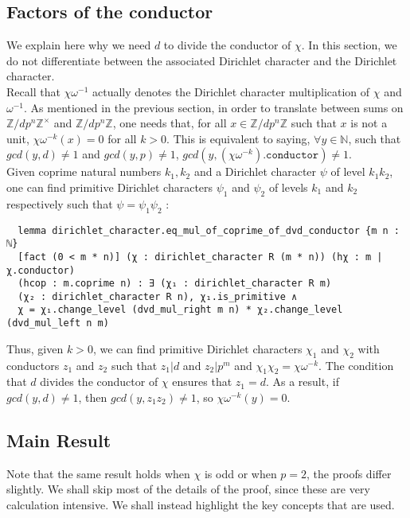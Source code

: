 \documentclass[a4paper,UKenglish,cleveref, autoref, thm-restate]{lipics-v2021}
\begin{document}
\subsection{Factors of the conductor}
We explain here why we need $d$ to divide the conductor of $\chi$. In this section, we do not differentiate between the associated Dirichlet 
character and the Dirichlet character. \\

Recall that $\chi \omega^{-1}$ actually denotes the Dirichlet 
character multiplication of $\chi$ and $\omega^{-1}$. As mentioned in the previous section, in order to translate between sums on 
$\mathbb{Z}/ d p^n \mathbb{Z} ^{\times}$ and $\mathbb{Z}/ d p^n \mathbb{Z}$, one needs that, for all $x \in \mathbb{Z}/ d p^n \mathbb{Z}$ 
such that $x$ is not a unit, $\chi \omega^{-k} (x) = 0$ for all $k > 0$. This is equivalent to saying, $\forall y \in \mathbb{N}$, such that 
$gcd (y, d) \ne 1$ and $gcd (y, p) \ne 1$, $gcd (y, (\chi \omega^{-k})\texttt{.conductor}) \ne 1$. \\

Given coprime natural numbers $k_1, k_2$ and a Dirichlet character $\psi$ of level $k_1 k_2$, one can find primitive Dirichlet characters 
$\psi_1$ and $\psi_2$ of levels $k_1$ and $k_2$ respectively such that $\psi = \psi_1 \psi_2$ : 
\begin{lstlisting}
  lemma dirichlet_character.eq_mul_of_coprime_of_dvd_conductor {m n : ℕ} 
  [fact (0 < m * n)] (χ : dirichlet_character R (m * n)) (hχ : m | χ.conductor) 
  (hcop : m.coprime n) : ∃ (χ₁ : dirichlet_character R m) 
  (χ₂ : dirichlet_character R n), χ₁.is_primitive ∧ 
  χ = χ₁.change_level (dvd_mul_right m n) * χ₂.change_level (dvd_mul_left n m) 
\end{lstlisting}

Thus, given $k > 0$, we can find primitive Dirichlet characters $\chi_1$ and $\chi_2$ with conductors $z_1$ and $z_2$ such that 
$z_1 | d$ and $z_2 | p^m$ and $\chi_1 \chi_2 = \chi \omega^{-k}$. The condition that $d$ divides the conductor of $\chi$ ensures 
that $z_1 = d$. As a result, if $gcd (y, d) \ne 1$, then $gcd (y, z_1 z_2) \ne 1$, so $\chi \omega^{-k} (y) = 0$.

\subsection{Main Result}
Note that the same result holds when $\chi$ is odd or when $p = 2$, the proofs differ slightly. We shall 
skip most of the details of the proof, since these are very calculation intensive. We shall instead highlight the key concepts 
that are used. \\
\end{document}
